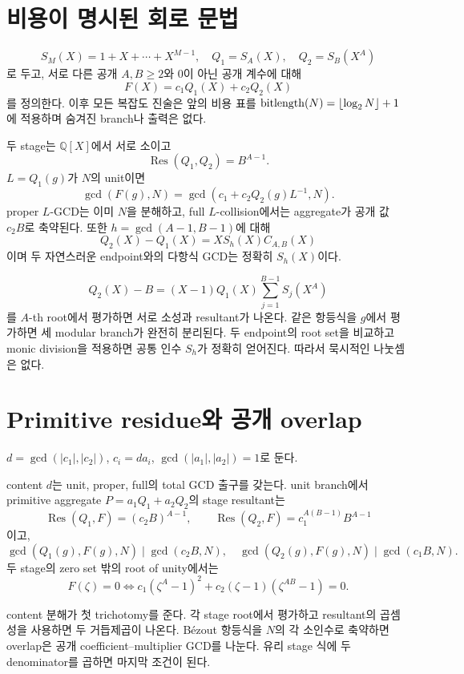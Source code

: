 \documentclass[11pt]{article}
\begin{document}
\section{비용이 명시된 회로 문법}

\[
S_M(X)=1+X+\cdots+X^{M-1},\quad
Q_1=S_A(X),\quad Q_2=S_B(X^A)
\]
로 두고, 서로 다른 공개 \(A,B\ge2\)와 0이 아닌 공개 계수에 대해
\[
F(X)=c_1Q_1(X)+c_2Q_2(X)
\]
를 정의한다. 이후 모든 복잡도 진술은 앞의 비용 표를
\(\operatorname{bitlength}(N)=\lfloor\log_2N\rfloor+1\)에 적용하며 숨겨진 branch나 출력은
없다.

{}
두 stage는 \(\mathbb Q[X]\)에서 서로
소이고
\[
\operatorname{Res}(Q_1,Q_2)=B^{A-1}.
\]
\(L=Q_1(g)\)가 \(N\)의 unit이면
\[
\gcd(F(g),N)=
\gcd(c_1+c_2Q_2(g)L^{-1},N).
\]
proper \(L\)-GCD는 이미 \(N\)을 분해하고, full \(L\)-collision에서는
aggregate가 공개 값 \(c_2B\)로 축약된다. 또한
\(h=\gcd(A-1,B-1)\)에 대해
\[
Q_2(X)-Q_1(X)=XS_h(X)C_{A,B}(X)
\]
이며 두 자연스러운 endpoint와의 다항식 GCD는 정확히 \(S_h(X)\)이다.

\begin{claimproof}
\[
Q_2(X)-B=(X-1)Q_1(X)\sum_{j=1}^{B-1}S_j(X^A)
\]
를 \(A\)-th root에서 평가하면 서로 소성과 resultant가 나온다. 같은
항등식을 \(g\)에서 평가하면 세 modular branch가 완전히 분리된다.
두 endpoint의 root set을 비교하고 monic division을 적용하면 공통
인수 \(S_h\)가 정확히 얻어진다. 따라서 묵시적인 나눗셈은 없다.
\end{claimproof}

\section{Primitive residue와 공개 overlap}

\(d=\gcd(|c_1|,|c_2|)\), \(c_i=da_i\),
\(\gcd(|a_1|,|a_2|)=1\)로 둔다.

{}
content \(d\)는 unit, proper, full의
total GCD 출구를 갖는다. unit branch에서 primitive aggregate
\(P=a_1Q_1+a_2Q_2\)의 stage resultant는
\[
\operatorname{Res}(Q_1,F)=(c_2B)^{A-1},\qquad
\operatorname{Res}(Q_2,F)=c_1^{A(B-1)}B^{A-1}
\]
이고,
\[
\gcd(Q_1(g),F(g),N)\mid\gcd(c_2B,N),\quad
\gcd(Q_2(g),F(g),N)\mid\gcd(c_1B,N).
\]
두 stage의 zero set 밖의 root of unity에서는
\[
F(\zeta)=0\iff
c_1(\zeta^A-1)^2+
c_2(\zeta-1)(\zeta^{AB}-1)=0.
\]

\begin{claimproof}
content 분해가 첫 trichotomy를 준다. 각 stage root에서 평가하고
resultant의 곱셈성을 사용하면 두 거듭제곱이 나온다. Bézout 항등식을
\(N\)의 각 소인수로 축약하면 overlap은 공개 coefficient--multiplier
GCD를 나눈다. 유리 stage 식에 두 denominator를 곱하면 마지막 조건이
된다.
\end{claimproof}
\end{document}
